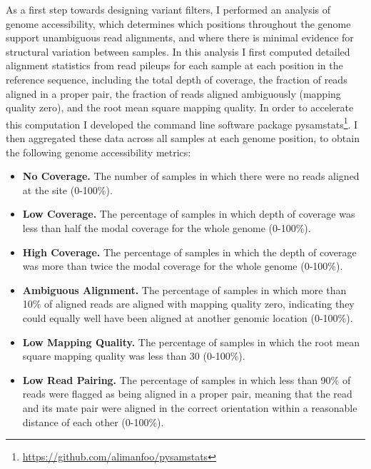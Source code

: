\documentclass[a4paper,11pt,abstracton,hidelinks]{scrartcl}
\begin{document}
As a first step towards designing variant filters, I performed an analysis of genome accessibility, which determines which positions throughout the genome support unambiguous read alignments, and where there is minimal evidence for structural variation between samples. 
%
In this analysis I first computed detailed alignment statistics from read pileups for each sample at each position in the reference sequence, including the total depth of coverage, the fraction of reads aligned in a proper pair, the fraction of reads aligned ambiguously (mapping quality zero), and the root mean square mapping quality.
%
In order to accelerate this computation I developed the command line software package pysamstats\footnote{\url{https://github.com/alimanfoo/pysamstats}}.
%
I then aggregated these data across all samples at each genome position, to obtain the following genome accessibility metrics:
%
\begin{itemize}
%
\item \textbf{No Coverage.} The number of samples in which there were no reads aligned at the site (0-100\%).
%
\item \textbf{Low Coverage.} The percentage of samples in which depth of coverage was less than half the modal coverage for the whole genome (0-100\%).
%
\item \textbf{High Coverage.} The percentage of samples in which the depth of coverage was more than twice the modal coverage for the whole genome (0-100\%).
%
\item \textbf{Ambiguous Alignment.} The percentage of samples in which more than 10\% of aligned reads are aligned with mapping quality zero, indicating they could equally well have been aligned at another genomic location (0-100\%).
%
\item \textbf{Low Mapping Quality.} The percentage of samples in which the root mean square mapping quality was less than 30 (0-100\%).
%  
\item \textbf{Low Read Pairing.} The percentage of samples in which less than 90\% of reads were flagged as being aligned in a proper pair, meaning that the read and its mate pair were aligned in the correct orientation within a reasonable distance of each other (0-100\%).
\end{itemize}
\end{document}
